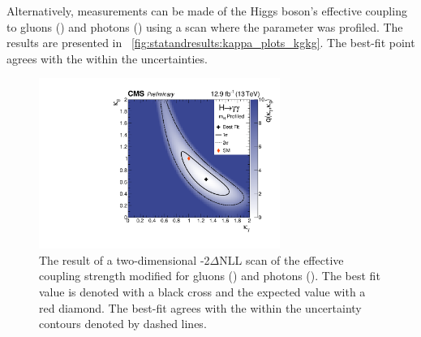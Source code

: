 Alternatively, measurements can be made of the Higgs boson's effective coupling to gluons (\kGlu) and photons (\kPho) using a \DNLL scan where the \mH parameter was profiled. The results are presented in \Fig~\ref{fig:statandresults:kappa_plots_kgkg}. The best-fit point agrees with the \SM within the uncertainties.


\begin{figure}[ht!]
\centering
\includegraphics[width=0.7\textwidth]{statandresultsFigures/KGluKGamScanProfileMH_granular_col.pdf} 
\caption{The result of a two-dimensional -2$\Delta$NLL scan of the effective coupling strength modified for gluons (\kGlu) and photons (\kPho). The best fit value is denoted with a black cross and the \SM expected value with a red diamond. The best-fit agrees with the \SM within the uncertainty contours denoted by dashed lines. }

\label{fig:statandresults:kappa_plots_kgkp}

\end{figure}
